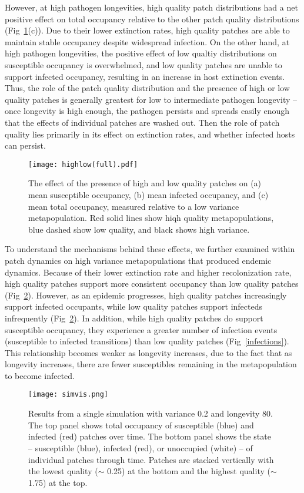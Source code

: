 \documentclass{svjour3}
\begin{document}
However, at high pathogen longevities, high quality patch distributions had a net positive effect on total occupancy relative to the other patch quality distributions (Fig~\ref{sens}(c)).  Due to their lower extinction rates, high quality patches are able to maintain stable occupancy despite widespread infection.  On the other hand, at high pathogen longevities, the positive effect of low qualtiy distributions on susceptible occupancy is overwhelmed, and low quality patches are unable to support infected occupancy, resulting in an increase in host extinction events.  Thus, the role of the patch quality distribution and the presence of high or low quality patches is generally greatest for low to intermediate pathogen longevity -- once longevity is high enough, the pathogen persists and spreads easily enough that the effects of individual patches are washed out.  Then the role of patch quality lies primarily in its effect on extinction rates, and whether infected hosts can persist.

\begin{figure}
\centering
\texttt{[image: highlow(full).pdf]}
\caption{The effect of the presence of high and low quality patches on (a) mean susceptible occupancy, (b) mean infected occupancy, and (c) mean total occupancy, measured relative to  a low variance metapopulation.  Red solid lines show hiqh quality metapopulations, blue dashed show low quality, and black shows high variance.}
\label{sens}
\end{figure}

To understand the mechanisms behind these effects, we further examined within patch dynamics on high variance metapopulations that produced endemic dynamics.  Because of their lower extinction rate and higher recolonization rate, high quality patches support more consistent occupancy than low quality patches (Fig~\ref{simvis}).  However, as an epidemic progresses, high quality patches increasingly support infected occupants, while low quality patches support infecteds infrequently (Fig~\ref{simvis}).  In addition, while high quality patches do support susceptible occupancy, they experience a greater number of infection events (susceptible to infected transitions) than low quality patches (Fig~\ref{infections}).  This relationship becomes weaker as longevity increases, due to the fact that as longevity increases, there are fewer susceptibles remaining in the metapopulation to become infected.  

\begin{figure}
\centering
\texttt{[image: simvis.png]}
\caption{Results from a single simulation with variance 0.2 and longevity 80.  The top panel shows total occupancy of susceptible (blue) and infected (red) patches over time.  The bottom panel shows the state -- susceptible (blue), infected (red), or unoccupied (white) -- of individual patches through time.  Patches are stacked vertically with the lowest quality ($\sim$ 0.25) at the bottom and the highest quality ($\sim$ 1.75) at the top.}
\label{simvis}
\end{figure}
\end{document}
